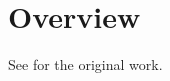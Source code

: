 \documentclass{article}
\begin{document}
\section{Overview}
See \cite{knuth84} for the original work.


\end{document}

